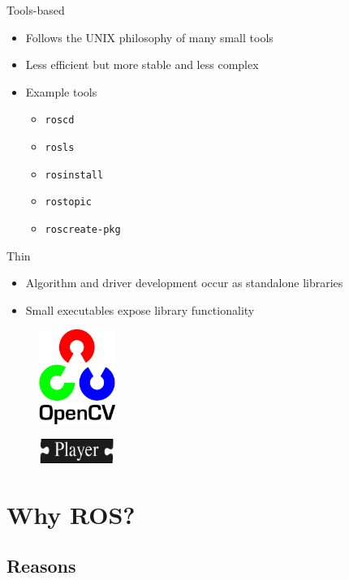 \documentclass{beamer}
\begin{document}
\begin{frame}{Tools-based}
  \begin{itemize}
  \item Follows the UNIX philosophy of many small tools
  \item Less efficient but more stable and less complex
  \item Example tools
    \begin{itemize}
    \item \texttt{roscd}
    \item \texttt{rosls}
    \item \texttt{rosinstall}
    \item \texttt{rostopic}
    \item \texttt{roscreate-pkg}
    \end{itemize}
  \end{itemize}
\end{frame}


\begin{frame}{Thin}
  \begin{itemize}
  \item Algorithm and driver development occur as standalone libraries
  \item Small executables expose library functionality
  \end{itemize}

  \begin{figure}
    \includegraphics[width=2.5cm]{opencv-logo.png}
  \end{figure}

  \begin{figure}
    \includegraphics[width=2.5cm]{player-logo.png}
  \end{figure}
\end{frame}


\section{Why ROS?}
\subsection{Reasons}
\end{document}

